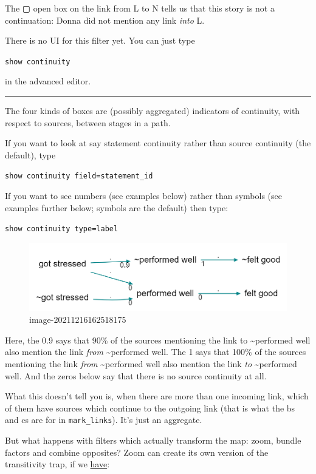 \documentclass[
]{book}
\begin{document}
The ▢ open box on the link from L to N tells us that this story is not a continuation: Donna did not mention any link \emph{into} L.

There is no UI for this filter yet. You can just type

\texttt{show\ continuity}

in the advanced editor.

\begin{center}\rule{0.5\linewidth}{0.5pt}\end{center}

The four kinds of boxes are (possibly aggregated) indicators of continuity, with respect to sources, between stages in a path.

If you want to look at say statement continuity rather than source continuity (the default), type

\texttt{show\ continuity\ field=statement\_id}

If you want to see numbers (see examples below) rather than symbols (see examples further below; symbols are the default) then type:

\texttt{show\ continuity\ type=label}

\begin{figure}
\centering
\includegraphics[width=6.77083in,height=\textheight]{_assets/image-20211216162518175.png}
\caption{image-20211216162518175}
\end{figure}

Here, the 0.9 says that 90\% of the sources mentioning the link to \textasciitilde performed well also mention the link \emph{from} \textasciitilde performed well. The 1 says that 100\% of the sources mentioning the link \emph{from} \textasciitilde performed well also mention the link \emph{to} \textasciitilde performed well. And the zeros below say that there is no source continuity at all.

What this doesn't tell you is, when there are more than one incoming link, which of them have sources which continue to the outgoing link (that is what the bs and cs are for in \texttt{mark\_links}). It's just an aggregate.

But what happens with filters which actually transform the map: zoom, bundle factors and combine opposites? Zoom can create its own version of the transitivity trap, if we \href{https://causalmap.shinyapps.io/CM2test/?s=415}{have}:
\end{document}
